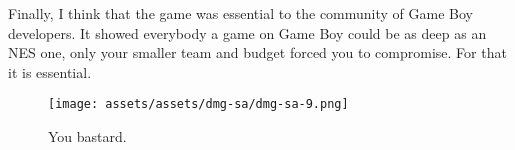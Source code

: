 \documentclass{book}
\begin{document}
Finally, I think that the game was essential to the community of Game Boy developers. It showed everybody a game on Game Boy could be as deep as an NES one, only your smaller team and budget forced you to compromise. For that it is essential.

\begin{figure}[hbt]
\vskip 10pt
\centering \texttt{[image: assets/assets/dmg-sa/dmg-sa-9.png]}\par\pagetwodescription You bastard.
\vskip 6pt
\end{figure}






















































\endgroup 
\end{document}

